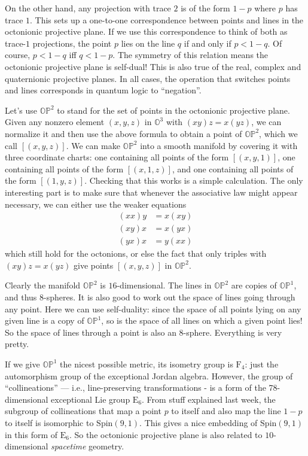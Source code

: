 \documentclass{article}
\begin{document}
On the other hand, any projection with trace \(2\) is of the form
\(1-p\) where \(p\) has trace \(1\). This sets up a one-to-one
correspondence between points and lines in the octonionic projective
plane. If we use this correspondence to think of both as trace-\(1\)
projections, the point \(p\) lies on the line \(q\) if and only if
\(p < 1 - q\). Of course, \(p < 1 - q\) iff \(q < 1 - p\). The symmetry
of this relation means the octonionic projective plane is self-dual!
This is also true of the real, complex and quaternionic projective
planes. In all cases, the operation that switches points and lines
corresponds in quantum logic to ``negation''.

Let's use \(\mathbb{OP}^2\) to stand for the set of points in the
octonionic projective plane. Given any nonzero element \((x,y,z)\) in
\(\mathbb{O}^3\) with \((xy)z = x(yz)\), we can normalize it and then
use the above formula to obtain a point of \(\mathbb{OP}^2\), which we
call \([(x,y,z)]\). We can make \(\mathbb{OP}^2\) into a smooth manifold
by covering it with three coordinate charts: one containing all points
of the form \([(x,y,1)]\), one containing all points of the form
\([(x,1,z)]\), and one containing all points of the form \([(1,y,z)]\).
Checking that this works is a simple calculation. The only interesting
part is to make sure that whenever the associative law might appear
necessary, we can either use the weaker equations \[
  \begin{aligned}
    (xx)y &= x(xy) 
  \\(xy)x &= x(yx)
  \\(yx)x &= y(xx)
  \end{aligned}
\] which still hold for the octonions, or else the fact that only
triples with \((xy)z = x(yz)\) give points \([(x,y,z)]\) in
\(\mathbb{OP}^2\).

Clearly the manifold \(\mathbb{OP}^2\) is \(16\)-dimensional. The lines
in \(\mathbb{OP}^2\) are copies of \(\mathbb{OP}^1\), and thus
8-spheres. It is also good to work out the space of lines going through
any point. Here we can use self-duality: since the space of all points
lying on any given line is a copy of \(\mathbb{OP}^1\), so is the space
of all lines on which a given point lies! So the space of lines through
a point is also an 8-sphere. Everything is very pretty.

If we give \(\mathbb{OP}^1\) the nicest possible metric, its isometry
group is \(\mathrm{F}_4\): just the automorphism group of the
exceptional Jordan algebra. However, the group of ``collineations'' ---
i.e., line-preserving transformations - is a form of the 78-dimensional
exceptional Lie group \(\mathrm{E}_6\). From stuff explained last week,
the subgroup of collineations that map a point \(p\) to itself and also
map the line \(1 - p\) to itself is isomorphic to
\(\mathrm{Spin}(9,1)\). This gives a nice embedding of
\(\mathrm{Spin}(9,1)\) in this form of \(\mathrm{E}_6\). So the
octonionic projective plane is also related to \(10\)-dimensional
\emph{spacetime} geometry.
\end{document}
